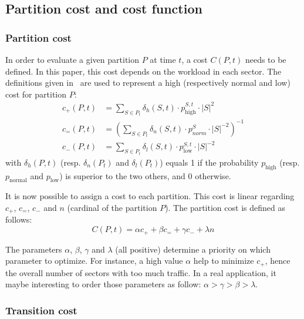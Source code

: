 \documentclass[oneside,twocolumn]{article}
\begin{document}
\subsection{Partition cost and cost function}

\subsubsection{Partition cost}

In order to evaluate a given partition $P$ at time $t$, a cost $C(P, t)$ needs
to be defined. In this paper, this cost depends on the workload in each
sector. The definitions given in~\cite{ferrari2017} are used to represent a high
(respectively normal and low) cost for partition \(P\):
\begin{equation}
  \begin{aligned}
    c_+(P, t) &= \sum_{S \in P_t} \delta_{h}(S, t) \cdot p_\text{high}^{S, t} \cdot |S|^2\\
    c_=(P, t) &= \left(
    \sum_{S \in P_t} \delta_{n}(S, t) \cdot p_{norm}^{S} \cdot |S|^{-2}
    \right)^{-1}\\
    c_-(P, t) &= \sum_{S \in P_t} \delta_{l}(S, t) \cdot p_\text{low}^{S, t} \cdot |S|^{-2}
  \end{aligned}
\end{equation}
with $\delta_{h}(P, t)$ (resp. $\delta_{n}(P_t)$ and $\delta_{l}(P_t)$) equals 1
if the probability $p_\text{high}$ (resp. $p_\text{normal}$ and $p_\text{low}$) is superior to
the two others, and 0 otherwise.

It is now possible to assign a cost to each partition. This cost is linear
regarding $c_+$, $c_=$, $c_-$ and $n$ (cardinal of the partition $P$). The
partition cost is defined as follows:
\begin{equation}
  C(P, t) = \alpha c_+ + \beta c_= + \gamma c_- +\lambda n
\end{equation}

The parameters $\alpha$, $\beta$, $\gamma$ and $\lambda$ (all positive)
determine a priority on which parameter to optimize. For instance, a high
value $\alpha$ help to
minimize $c_+$, hence the overall number of sectors with too much traffic.
In a real application, it maybe interesting to order those parameters as
follow: $\alpha > \gamma > \beta > \lambda$.

\subsubsection{Transition cost}
\end{document}
